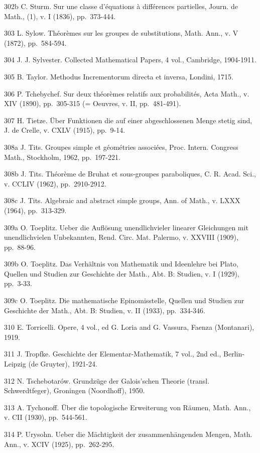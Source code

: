 302b C. Sturm. Sur une classe d'équations à différences partielles, Journ. de Math., (1), v. I (1836), pp.~373-444.

303 L. Sylow. Théorèmes sur les groupes de substitutions, Math. Ann., v. V (1872), pp.~584-594.

304 J. J. Sylvester. Collected Mathematical Papers, 4 vol., Cambridge, 1904-1911.

305 B. Taylor. Methodus Incrementorum directa et inversa, Londini, 1715.

306 P. Tchebychef. Sur deux théorèmes relatifs aux probabilités, Acta Math., v. XIV (1890), pp.~305-315 (= Oeuvres, v. II, pp.~481-491).

307 H. Tietze. Über Funktionen die auf einer abgeschlossenen Menge stetig sind, J. de Crelle, v. CXLV (1915), pp.~9-14.

308a J. Tits. Groupes simple et géométries associées, Proc. Intern. Congress Math., Stockholm, 1962, pp.~197-221.

308b J. Tits. Théorème de Bruhat et sous-groupes paraboliques, C. R. Acad. Sci., v. CCLIV (1962), pp.~2910-2912.

308c J. Tits. Algebraic and abstract simple groups, Ann. of Math., v. LXXX (1964), pp.~313-329.

309a O. Toeplitz. Ueber die Auflösung unendlichvieler linearer Gleichungen mit unendlichvielen Unbekannten, Rend. Circ. Mat. Palermo, v. XXVIII (1909), pp.~88-96.

309b O. Toeplitz. Das Verhältnis von Mathematik und Ideenlehre bei Plato, Quellen und Studien zur Geschichte der Math., Abt. B: Studien, v. I (1929), pp.~3-33.

309c O. Toeplitz. Die mathematische Epinomisstelle, Quellen und Studien zur Geschichte der Math., Abt. B: Studien, v. II (1933), pp.~334-346.

310 E. Torricelli. Opere, 4 vol., ed G. Loria and G. Vassura, Faenza (Montanari), 1919.

311 J. Tropfke. Geschichte der Elementar-Mathematik, 7 vol., 2nd ed., Berlin-Leipzig (de Gruyter), 1921-24.

312 N. Tschebotarów. Grundzüge der Galois'schen Theorie (transl. Schwerdtfeger), Groningen (Noordhoff), 1950.

313 A. Tychonoff. Über die topologische Erweiterung von Räumen, Math. Ann., v. CII (1930), pp.~544-561.

314 P. Urysohn. Ueber die Mächtigkeit der zusammenhängenden Mengen, Math. Ann., v. XCIV (1925), pp.~262-295.

